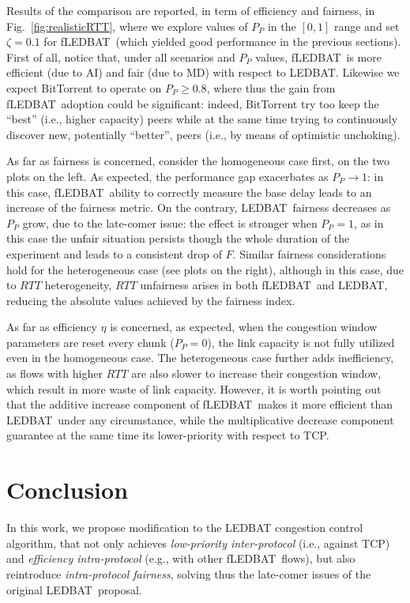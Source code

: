 \documentclass[conference]{IEEEtran}
\newcommand{\figR}[1]{Fig.~\ref{fig:#1}}
\newcommand{\btledbat}[0]{LEDBAT}
\newcommand{\fledbat}[0]{fLEDBAT}
\begin{document}
Results of the comparison are reported, in term of efficiency and fairness, in
\figR{realisticRTT}, where we explore values of $P_P$ in the $[0,1]$ range and set $\zeta=0.1$
for \fledbat\ (which yielded good performance in the previous sections).
First of all, notice that, under all scenarios and $P_P$ values, \fledbat\ is more efficient
(due to AI) and fair (due to MD) with respect to \btledbat.
Likewise we expect BitTorrent to operate on $P_P\ge0.8$, where thus the gain from \fledbat\
adoption could be significant: indeed, BitTorrent try too keep the ``best'' (i.e., higher capacity)
peers  while at the same time trying to continuously discover new, potentially ``better'',
peers (i.e., by means of optimistic unchoking).

As far as fairness is concerned, consider the homogeneous case first, on the two plots on the left.
As expected, the performance gap exacerbates as $P_P\rightarrow 1$: in this case, \fledbat\ ability
to correctly measure the base delay leads to an increase of the fairness metric. On the contrary,
\btledbat\ fairness decreases as $P_P$ grow, due to the late-comer issue: the effect is stronger
when $P_P=1$, as in this case the unfair situation persists though the whole duration of the experiment
and leads to a consistent drop of $F$. Similar fairness considerations hold for the heterogeneous
case (see plots on the right), although in this case, due to $RTT$ heterogeneity, $RTT$ unfairness
arises in both \fledbat\ and \btledbat, reducing the absolute values achieved by the fairness index.

As far as efficiency $\eta$ is concerned, as expected, when the congestion window parameters are
reset every chunk ($P_P=0$), the link capacity is not fully utilized even in the homogeneous case.
The heterogeneous case further adds inefficiency, as flows with higher $RTT$ are also slower to
increase their congestion window, which result in more waste of link capacity.
However, it is worth pointing out that the additive increase component of \fledbat\ makes it more efficient than \btledbat\ under any circumstance, while the multiplicative decrease component guarantee at the same time its lower-priority with respect to TCP.


\section{Conclusion}\label{sec:outro}

In this work, we propose modification to the LEDBAT congestion control algorithm, that not only achieves \emph{low-priority inter-protocol} (i.e., against TCP) and \emph{efficiency intra-protocol} (e.g., with other \fledbat\  flows), but also reintroduce \emph{intra-protocol fairness}, solving thus the late-comer issues of the original \btledbat\ proposal.
\end{document}
